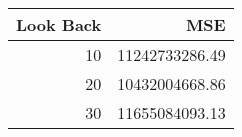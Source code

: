 \begin{tabular}{rr}
    \toprule
    Look Back & MSE \\
    \midrule
    10 & 11242733286.49 \\
    20 & 10432004668.86 \\
    30 & 11655084093.13 \\
    \bottomrule
\end{tabular}
